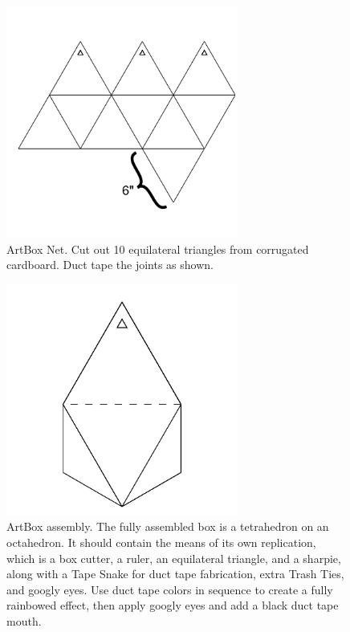 \begin{figure}
	\centering
	\includegraphics[width=3in]{figures/actiongeometry/artboxnet.png}
	\caption[artboxnet]
	{ArtBox Net.  Cut out 10 equilateral triangles from corrugated cardboard.  Duct tape the joints as shown.}
\end{figure}

\begin{figure}
	\centering
	\includegraphics[width=3in]{figures/actiongeometry/artbox.png}
	\caption[artbox]
	{ArtBox assembly.  The fully assembled box is a tetrahedron on an octahedron.  It should contain the means of its own replication, which is a box cutter, a ruler, an equilateral triangle, and a sharpie, along with a Tape Snake for duct tape fabrication, extra Trash Ties, and googly eyes.  Use duct tape colors in sequence to create a fully rainbowed effect, then apply googly eyes and add a black duct tape mouth.}
\end{figure}

